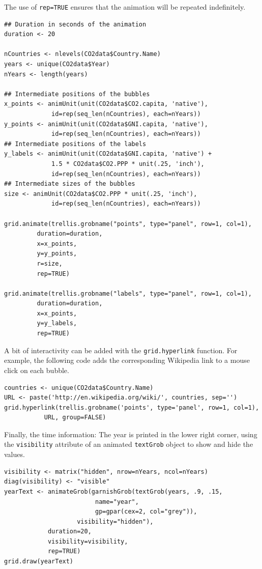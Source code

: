 The use of \texttt{rep=TRUE} ensures that the animation will be repeated
indefinitely.


\lstset{language=R,numbers=none}
\begin{lstlisting}
## Duration in seconds of the animation
duration <- 20

nCountries <- nlevels(CO2data$Country.Name)
years <- unique(CO2data$Year)
nYears <- length(years)

## Intermediate positions of the bubbles
x_points <- animUnit(unit(CO2data$CO2.capita, 'native'),
		     id=rep(seq_len(nCountries), each=nYears))
y_points <- animUnit(unit(CO2data$GNI.capita, 'native'),
		     id=rep(seq_len(nCountries), each=nYears))
## Intermediate positions of the labels
y_labels <- animUnit(unit(CO2data$GNI.capita, 'native') +
		     1.5 * CO2data$CO2.PPP * unit(.25, 'inch'),
		     id=rep(seq_len(nCountries), each=nYears))
## Intermediate sizes of the bubbles
size <- animUnit(CO2data$CO2.PPP * unit(.25, 'inch'),
		     id=rep(seq_len(nCountries), each=nYears))

grid.animate(trellis.grobname("points", type="panel", row=1, col=1),
	     duration=duration,
	     x=x_points,
	     y=y_points,
	     r=size,
	     rep=TRUE)

grid.animate(trellis.grobname("labels", type="panel", row=1, col=1),
	     duration=duration,
	     x=x_points,
	     y=y_labels,
	     rep=TRUE)
\end{lstlisting}

A bit of interactivity can be added with the \texttt{grid.hyperlink}
function. For example, the following code adds the corresponding
Wikipedia link to a mouse click on each bubble.


\lstset{language=R,numbers=none}
\begin{lstlisting}
countries <- unique(CO2data$Country.Name)
URL <- paste('http://en.wikipedia.org/wiki/', countries, sep='')
grid.hyperlink(trellis.grobname('points', type='panel', row=1, col=1),
	       URL, group=FALSE)
\end{lstlisting}

Finally, the time information: The year is printed in the lower
right corner, using the \texttt{visibility} attribute of an animated
\texttt{textGrob} object to show and hide the values.
\lstset{language=R,numbers=none}
\begin{lstlisting}
visibility <- matrix("hidden", nrow=nYears, ncol=nYears)
diag(visibility) <- "visible"
yearText <- animateGrob(garnishGrob(textGrob(years, .9, .15,
					     name="year",
					     gp=gpar(cex=2, col="grey")),
				    visibility="hidden"),
			duration=20,
			visibility=visibility,
			rep=TRUE)
grid.draw(yearText)
\end{lstlisting}

